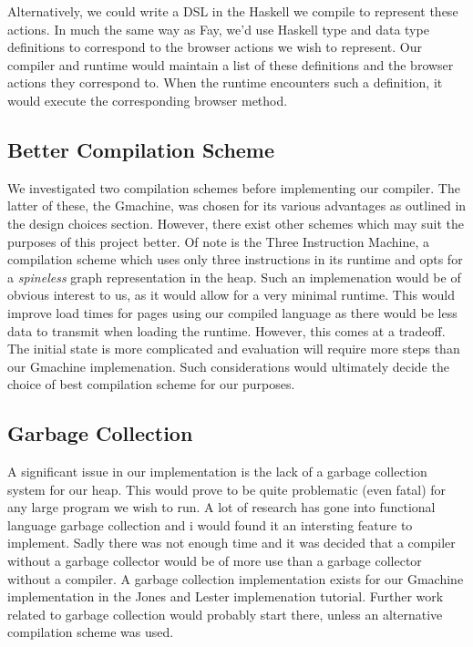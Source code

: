 Alternatively, we could write a DSL in the Haskell we compile to
represent these actions. In much the same way as Fay, we'd use Haskell
type and data type definitions to correspond to the browser actions
we wish to represent. Our compiler and runtime would maintain a list
of these definitions and the browser actions they correspond to. When
the runtime encounters such a definition, it would execute the corresponding
browser method.

\subsection{Better Compilation Scheme}
We investigated two compilation schemes before implementing our compiler.
The latter of these, the Gmachine, was chosen for its various advantages
as outlined in the design choices section. However, there exist other
schemes which may suit the purposes of this project better. Of note is
the Three Instruction Machine, a compilation scheme which uses only
three instructions in its runtime and opts for a \emph{spineless} graph 
representation in the heap. Such an implemenation would be of obvious
interest to us, as it would allow for a very minimal runtime. This would
improve load times for pages using our compiled language as there would
be less data to transmit when loading the runtime. However, this comes
at a tradeoff. The initial state is more complicated and evaluation will
require more steps than our Gmachine implemenation. Such considerations
would ultimately decide the choice of best compilation scheme for our
purposes. 

\subsection{Garbage Collection}
A significant issue in our implementation is the lack of a garbage collection
system for our heap. This would prove to be quite problematic (even fatal)
for any large program we wish to run. A lot of research has gone into
functional language garbage collection and i would found it an intersting
feature to implement. Sadly there was not enough time and it was decided
that a compiler without a garbage collector would be of more use than a 
garbage collector without a compiler. A garbage collection implementation
exists for our Gmachine implementation in the Jones and Lester implemenation
tutorial. Further work related to garbage collection would probably start
there, unless an alternative compilation scheme was used.
